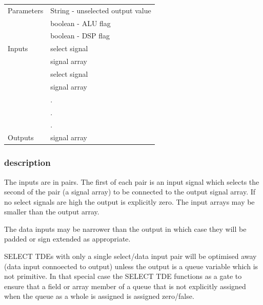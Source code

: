                 \begin{tabular}{| l | l |}
                \hline
                Parameters  & String - unselected output value \\
                            & boolean - ALU flag \\
                            & boolean - DSP flag \\
                \hline
                Inputs      & select signal \\
                            & signal array \\
                            & select signal \\
                            & signal array \\
                            & . \\
                            & . \\
                            & . \\
                \hline
                Outputs     & signal array \\
                \hline
                \end{tabular}

            \subsubsection{description}

                The inputs are in pairs. The first of each pair is an
                input signal which selects the second of the pair (a signal
                array) to be connected to the output signal array. If no
                select signals are high the output is explicitly zero.
                The input arrays may be smaller than the output array.
                
                The data inputs may be narrower than the output in which case
                they will be padded or sign extended as appropriate.
                
                SELECT TDEs with only a single select/data input pair will be
                optimised away (data input connoected to output) unless the
                output is a queue variable which is not primitive. In that special
                case the SELECT TDE functions as a gate to ensure that a field
                or array member of a queue that is not explicitly assigned when
                the queue as a whole is assigned is assigned zero/false.

